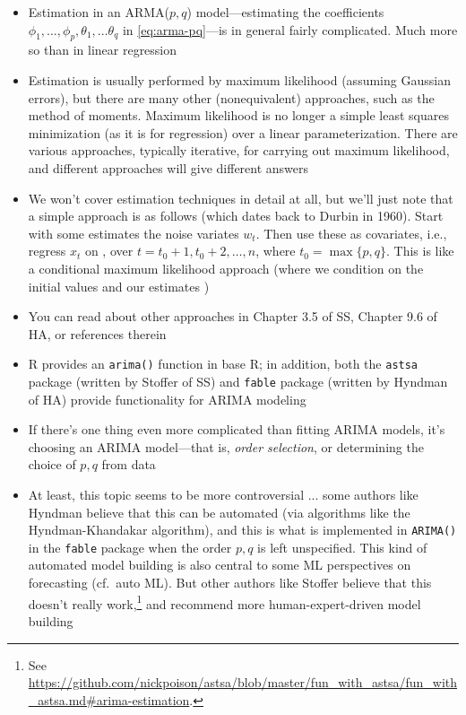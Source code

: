 \documentclass{article}
\begin{document}
\begin{itemize}
\item Estimation in an ARMA($p,q$) model---estimating the coefficients
  $\phi_1,\dots,\phi_p,\theta_1,\dots\theta_q$ in \eqref{eq:arma-pq}---is in 
  general fairly complicated. Much more so than in linear regression 

\item Estimation is usually performed by maximum likelihood (assuming Gaussian
  errors), but there are many other (nonequivalent) approaches, such as the
  method of moments. Maximum likelihood is no longer a simple least squares 
  minimization (as it is for regression) over a linear parameterization. There
  are various approaches, typically iterative, for carrying out maximum
  likelihood, and different approaches will give different answers     

\item We won't cover estimation techniques in detail at all, but we'll just note
  that a simple approach is as follows (which dates back to Durbin in
  1960). Start with some estimates  the noise variates
  $w_t$. Then use these as covariates, i.e., regress $x_t$ on
  , over $t =
  t_0+1,t_0+2,\dots,n$, where $t_0 = \max\{p,q\}$. This is like a conditional  
  maximum likelihood approach (where we condition on the initial values
   and our estimates
  )

\item You can read about other approaches in Chapter 3.5 of SS, Chapter 9.6 of
  HA, or references therein  

\item R provides an \verb|arima()| function in base R; in addition, both the
  \verb|astsa| package (written by Stoffer of SS) and \verb|fable| package
  (written by Hyndman of HA) provide functionality for ARIMA modeling

\item If there's one thing even more complicated than fitting ARIMA models, it's
  choosing an ARIMA model---that is, \emph{order selection}, or determining the 
  choice of $p,q$ from data 

\item At least, this topic seems to be more controversial ... some authors like
  Hyndman believe that this can be automated (via algorithms like the
  Hyndman-Khandakar algorithm), and this is what is implemented in
  \verb|ARIMA()| in the \verb|fable| package when the order $p,q$ is left 
  unspecified. This kind of automated model building is also central to some ML 
  perspectives on forecasting (cf.\ auto ML). But other authors like Stoffer
  believe that this doesn't really work,\footnote{See
    \url{https://github.com/nickpoison/astsa/blob/master/fun_with_astsa/fun_with_astsa.md\#arima-estimation}.}  
  and recommend more human-expert-driven model building  


\end{itemize}
\end{document}
